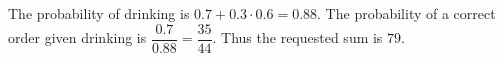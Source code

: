 The probability of drinking is $0.7+0.3\cdot0.6=0.88$. The probability of a correct order given drinking is $\dfrac{0.7}{0.88}=\dfrac{35}{44}$. Thus the requested sum is $\boxed{79}$.

